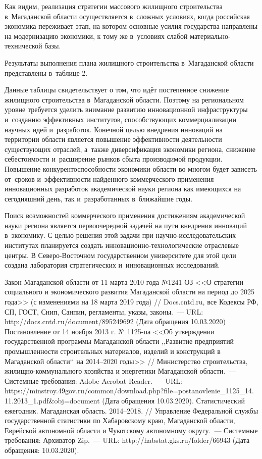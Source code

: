 Как видим, реализация стратегии массового жилищного строительства в~Магаданской области осуществляется в~сложных условиях, когда российская экономика переживает этап, на котором основные усилия государства направлены на модернизацию экономики, к тому же в~условиях слабой материально-технической базы.

Результаты выполнения плана жилищного строительства в~Магаданской области представлены в~таблице 2.



Данные таблицы свидетельствует о том, что идёт постепенное снижение жилищного строительства в~Магаданской области. Поэтому на региональном уровне требуется уделить внимание развитию инновационной инфраструктуры и~созданию эффективных институтов, способствующих коммерциализации научных идей и~разработок. Конечной целью внедрения инноваций на территории области является повышение эффективности деятельности существующих отраслей, а~также диверсификация экономики региона, снижение себестоимости и~расширение рынков сбыта производимой продукции.
\clearpage
Повышение конкурентоспособности экономики области во многом будет зависеть от~сроков и~эффективности найденного коммерческого применения инновационных разработок академической науки региона как имеющихся на сегодняшний день, так и~разработанных в~ближайшие годы.

Поиск возможностей коммерческого применения достижениям академической науки региона является первоочередной задачей на пути внедрения инноваций в~экономику. С целью решения этой задачи при научно-исследовательских институтах планируется создать ин\-но\-ва\-цион\-но-тех\-но\-ло\-ги\-чес\-кие отраслевые центры. В Северо-Восточном государственном университете для этой цели создана лаборатория стратегических и~инновационных исследований.

\begin{thebibliography}{99}
\bibitem{}Закон Магаданской области от 11 марта 2010 года №1241-ОЗ <<О стратегии социального и экономического развития Магаданской области на период до 2025 года>> (с изменениями на 18 марта 2019 года) // Docs.cntd.ru, все Кодексы РФ, СП, ГОСТ, Снип, Санпин, регламенты, указы, законы.~--- URL: http://docs.cntd.ru/document/895249692 (Дата обращения 10.03.2020)
\bibitem{}Постановление от 14 ноября 2013 г. № 1125-па <<Об утверждении государственной программы Магаданской области ,,Развитие предприятий промышленности строительных материалов, изделий и конструкций в Магаданской области‘‘ на 2014--2020 годы>> // Министерство строительства, жилищно-коммунального хозяйства и энергетики Магаданской области.~--- Системные требования: Adobe Acrobat Reader.~--- URL:
https://minstroy.49gov.ru/common/download.php?file=postanovlenie\_1125\_14.\\11.2013\_1.pdf\&obj=document (Дата обращения 10.03.2020).
\bibitem{}Статистический ежегодник. Магаданская область. 2014--2018. // Управление Федеральной службы государственной статистики по Хабаровскому краю, Магаданской области, Еврейской автономной области и Чукотскому автономному округу.~--- Системные требования: Архиватор Zip.~--- URL: http://habstat.gks.ru/folder/66943 (Дата обращения: 10.03.2020).

\end{thebibliography}

